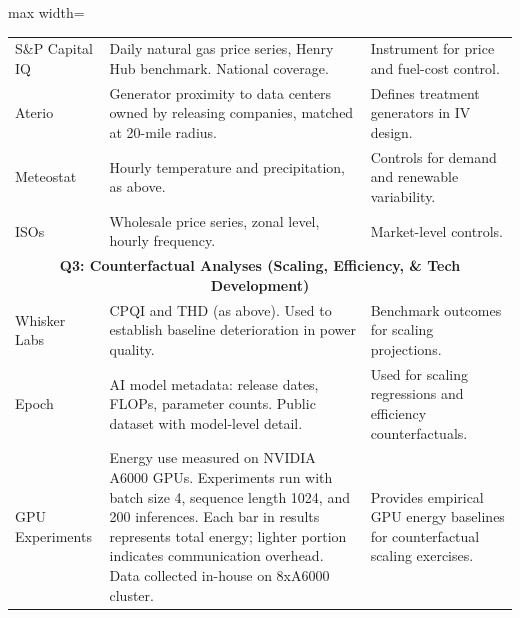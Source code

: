 \documentclass[sigconf]{acmart}
\begin{document}
\begin{table}
\begin{adjustbox}{max width=\textheight}
\begin{threeparttable}
\begin{tabular}{p{0.18\textheight} p{0.55\textheight} p{0.25\textheight}}
S\&P Capital IQ & Daily natural gas price series, Henry Hub benchmark. National coverage. & Instrument for price and fuel-cost control. \\
Aterio & Generator proximity to data centers owned by releasing companies, matched at 20-mile radius. & Defines treatment generators in IV design. \\
Meteostat & Hourly temperature and precipitation, as above. & Controls for demand and renewable variability. \\
ISOs & Wholesale price series, zonal level, hourly frequency. & Market-level controls. \\
\midrule
\multicolumn{3}{c}{\textbf{Q3: Counterfactual Analyses (Scaling, Efficiency,  \& Tech Development)}} \\
\midrule
Whisker Labs & CPQI and THD (as above). Used to establish baseline deterioration in power quality. & Benchmark outcomes for scaling projections. \\
Epoch & AI model metadata: release dates, FLOPs, parameter counts. Public dataset with model-level detail. & Used for scaling regressions and efficiency counterfactuals. \\
GPU Experiments & Energy use measured on NVIDIA A6000 GPUs. Experiments run with batch size 4, sequence length 1024, and 200 inferences. Each bar in results represents total energy; lighter portion indicates communication overhead. Data collected in-house on 8xA6000 cluster. & Provides empirical GPU energy baselines for counterfactual scaling exercises. \\
\bottomrule
\end{tabular}
\end{threeparttable}
\end{adjustbox}
\end{table}
\clearpage

\newpage
\clearpage

\setlength{\rotFPtop}{0pt plus 1fil}
\setlength{\rotFPbot}{0pt plus 1fil}
\end{document}
